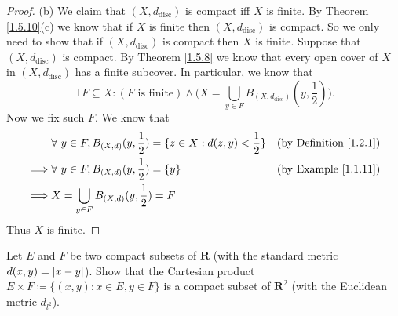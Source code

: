\begin{proof}{(b)}
    We claim that \((X, d_{\text{disc}})\) is compact iff \(X\) is finite.
    By Theorem \ref{1.5.10}(c) we know that if \(X\) is finite then \((X, d_{\text{disc}})\) is compact.
    So we only need to show that if \((X, d_{\text{disc}})\) is compact then \(X\) is finite.
    Suppose that \((X, d_{\text{disc}})\) is compact.
    By Theorem \ref{1.5.8} we know that every open cover of \(X\) in \((X, d_{\text{disc}})\) has a finite subcover.
    In particular, we know that
    \[
        \exists\ F \subseteq X : (F \text{ is finite}) \land \bigg(X = \bigcup_{y \in F} B_{(X, d_{\text{disc}})}(y, \frac{1}{2})\bigg).
    \]
    Now we fix such \(F\).
    We know that
    \begin{align*}
                 & \forall\ y \in F, B_{(X, d)}(y, \frac{1}{2}) = \{z \in X : d(z, y) < \frac{1}{2}\} & \text{(by Definition \ref{1.2.1})} \\
        \implies & \forall\ y \in F, B_{(X, d)}(y, \frac{1}{2}) = \{y\}                               & \text{(by Example \ref{1.1.11})}   \\
        \implies & X = \bigcup_{y \in F} B_{(X, d)}(y, \frac{1}{2}) = F
    \end{align*}
    Thus \(X\) is finite.
\end{proof}

\begin{exercise}\label{ex 1.5.13}
    Let \(E\) and \(F\) be two compact subsets of \(\mathbf{R}\) (with the standard metric \(d(x, y) = \abs*{x - y}\)).
    Show that the Cartesian product \(E \times F \coloneqq \{(x, y) : x \in E, y \in F\}\) is a compact subset of \(\mathbf{R}^2\) (with the Euclidean metric \(d_{l^2}\)).
\end{exercise}

